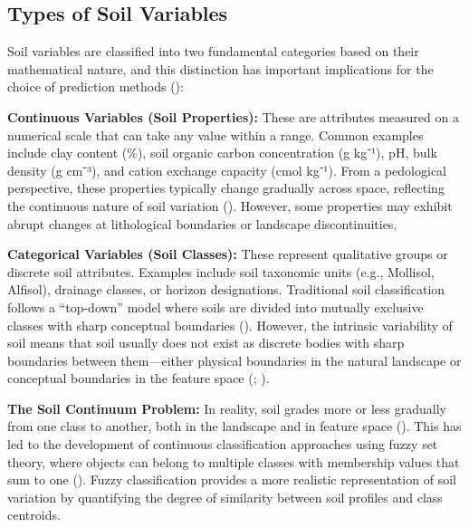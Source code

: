 \documentclass[
  10pt,
  b5paper,
  oneside]{book}
\begin{document}
\subsection{Types of Soil Variables}\label{types-of-soil-variables}

Soil variables are classified into two fundamental categories based on their mathematical nature, and this distinction has important implications for the choice of prediction methods ():

\textbf{Continuous Variables (Soil Properties):} These are attributes measured on a numerical scale that can take any value within a range. Common examples include clay content (\%), soil organic carbon concentration (g kg⁻¹), pH, bulk density (g cm⁻³), and cation exchange capacity (cmol kg⁻¹). From a pedological perspective, these properties typically change gradually across space, reflecting the continuous nature of soil variation (). However, some properties may exhibit abrupt changes at lithological boundaries or landscape discontinuities.

\textbf{Categorical Variables (Soil Classes):} These represent qualitative groups or discrete soil attributes. Examples include soil taxonomic units (e.g., Mollisol, Alfisol), drainage classes, or horizon designations. Traditional soil classification follows a ``top-down'' model where soils are divided into mutually exclusive classes with sharp conceptual boundaries (). However, the intrinsic variability of soil means that soil usually does not exist as discrete bodies with sharp boundaries between them---either physical boundaries in the natural landscape or conceptual boundaries in the feature space (; ).

\textbf{The Soil Continuum Problem:} In reality, soil grades more or less gradually from one class to another, both in the landscape and in feature space (). This has led to the development of continuous classification approaches using fuzzy set theory, where objects can belong to multiple classes with membership values that sum to one (). Fuzzy classification provides a more realistic representation of soil variation by quantifying the degree of similarity between soil profiles and class centroids.
\end{document}
